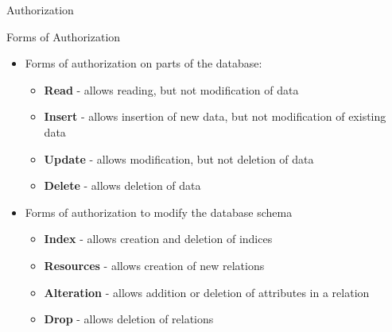 \documentclass[aspectratio=169, xcolor=dvipsnames]{beamer}
\begin{document}
\begin{frame}{Authorization}
    \begin{block}{Forms of Authorization}
        \begin{itemize}[<+->]
            \item Forms of authorization on parts of the database:
            \begin{itemize}
                \item[$\triangleright$] \textbf{Read} - allows reading, but not modification of data
                \item[$\triangleright$] \textbf{Insert} - allows insertion of new data, but not modification of existing data
                \item[$\triangleright$] \textbf{Update} - allows modification, but not deletion of data
                \item[$\triangleright$] \textbf{Delete} - allows deletion of data
            \end{itemize}
            \item Forms of authorization to modify the database schema
            \begin{itemize}
                \item[$\triangleright$] \textbf{Index} - allows creation and deletion of indices
                \item[$\triangleright$] \textbf{Resources} - allows creation of new relations
                \item[$\triangleright$] \textbf{Alteration} - allows addition or deletion of attributes in a relation
                \item[$\triangleright$] \textbf{Drop} - allows deletion of relations
            \end{itemize}
        \end{itemize}
    \end{block}
\end{frame}
\end{document}
